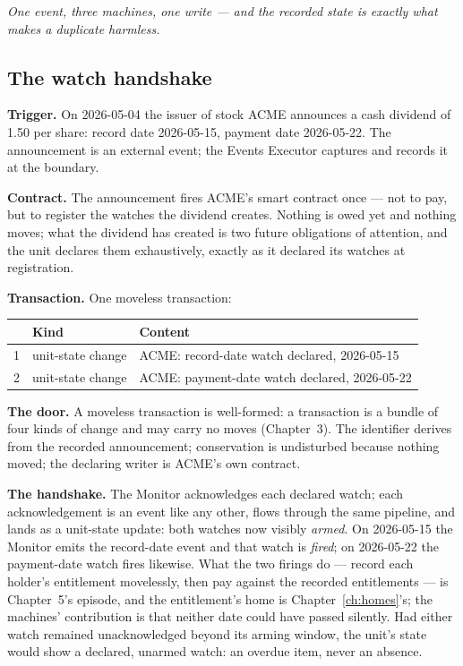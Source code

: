 \emph{One event, three machines, one write --- and the recorded state is
exactly what makes a duplicate harmless.}

\subsection{The watch handshake}

\textbf{Trigger.} On 2026-05-04 the issuer of stock ACME announces a cash
dividend of 1.50 per share: record date 2026-05-15, payment date 2026-05-22.
The announcement is an external event; the Events Executor captures and records
it at the boundary.

\textbf{Contract.} The announcement fires ACME's smart contract once --- not to
pay, but to register the watches the dividend creates. Nothing is owed yet and
nothing moves; what the dividend has created is two future obligations of
attention, and the unit declares them exhaustively, exactly as it declared its
watches at registration.

\textbf{Transaction.} One moveless transaction:

\begin{center}
\begin{tabular}{@{}rll@{}}
\toprule
 & Kind & Content \\
\midrule
1 & unit-state change & ACME: record-date watch declared, 2026-05-15 \\
2 & unit-state change & ACME: payment-date watch declared, 2026-05-22 \\
\bottomrule
\end{tabular}
\end{center}

\textbf{The door.} A moveless transaction is well-formed: a transaction is a
bundle of four kinds of change and may carry no moves (Chapter~3). The
identifier derives from the recorded announcement; conservation is undisturbed
because nothing moved; the declaring writer is ACME's own contract.

\textbf{The handshake.} The Monitor acknowledges each declared watch; each
acknowledgement is an event like any other, flows through the same pipeline,
and lands as a unit-state update: both watches now visibly \emph{armed}. On
2026-05-15 the Monitor emits the record-date event and that watch is
\emph{fired}; on 2026-05-22 the payment-date watch fires likewise. What the two
firings do --- record each holder's entitlement movelessly, then pay against
the recorded entitlements --- is Chapter~5's episode, and the entitlement's
home is Chapter~\ref{ch:homes}'s; the machines' contribution is that neither
date could have passed silently. Had either watch remained unacknowledged
beyond its arming window, the unit's state would show a declared, unarmed
watch: an overdue item, never an absence.

